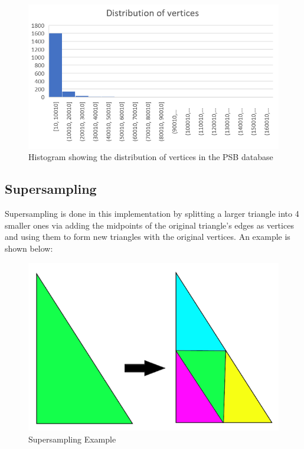 \documentclass{bigdata}
\begin{document}
\begin{figure}[h!]
  \centering
    \includegraphics[width=\linewidth]{Pictures/verticesHist.png}
    \caption{Histogram showing the distribution of vertices in the PSB database}
\end{figure}

\subsection{Supersampling}
Supersampling is done in this implementation by splitting a larger triangle into 4 smaller ones via adding the midpoints of the original triangle’s edges as vertices and using them to form new triangles with the original vertices. An example is shown below:

\begin{figure}[h!]
  \centering
  \includegraphics[width=\linewidth]{Pictures/triangle.png}
  \caption{Supersampling Example}
\end{figure}
\end{document}
